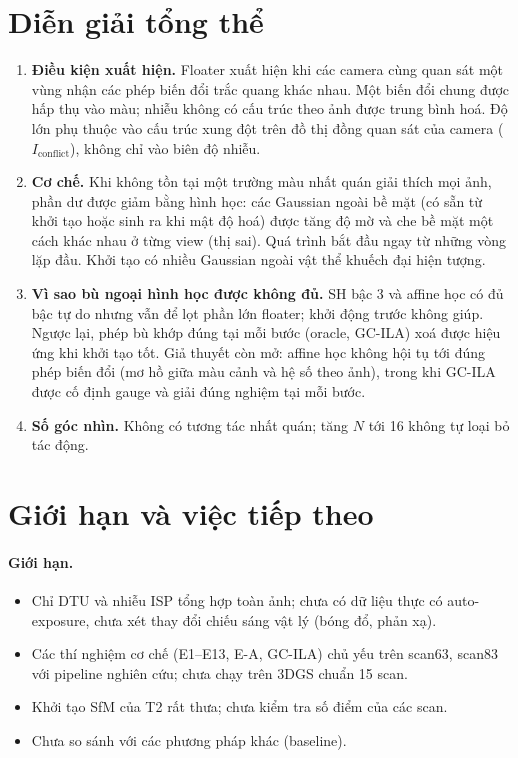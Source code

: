 \documentclass[11pt,a4paper]{article}
\begin{document}
\section{Diễn giải tổng thể}
\begin{enumerate}
  \item \textbf{Điều kiện xuất hiện.} Floater xuất hiện khi các camera cùng quan sát một vùng nhận các phép biến đổi trắc quang khác nhau. Một biến đổi chung được hấp thụ vào màu; nhiễu không có cấu trúc theo ảnh được trung bình hoá. Độ lớn phụ thuộc vào cấu trúc xung đột trên đồ thị đồng quan sát của camera ($I_{\text{conflict}}$), không chỉ vào biên độ nhiễu.
  \item \textbf{Cơ chế.} Khi không tồn tại một trường màu nhất quán giải thích mọi ảnh, phần dư được giảm bằng hình học: các Gaussian ngoài bề mặt (có sẵn từ khởi tạo hoặc sinh ra khi mật độ hoá) được tăng độ mờ và che bề mặt một cách khác nhau ở từng view (thị sai). Quá trình bắt đầu ngay từ những vòng lặp đầu. Khởi tạo có nhiều Gaussian ngoài vật thể khuếch đại hiện tượng.
  \item \textbf{Vì sao bù ngoại hình học được không đủ.} SH bậc 3 và affine học có đủ bậc tự do nhưng vẫn để lọt phần lớn floater; khởi động trước không giúp. Ngược lại, phép bù khớp đúng tại mỗi bước (oracle, GC-ILA) xoá được hiệu ứng khi khởi tạo tốt. Giả thuyết còn mở: affine học không hội tụ tới đúng phép biến đổi (mơ hồ giữa màu cảnh và hệ số theo ảnh), trong khi GC-ILA được cố định gauge và giải đúng nghiệm tại mỗi bước.
  \item \textbf{Số góc nhìn.} Không có tương tác nhất quán; tăng $N$ tới 16 không tự loại bỏ tác động.
\end{enumerate}

\section{Giới hạn và việc tiếp theo}
\paragraph{Giới hạn.}
\begin{itemize}
  \item Chỉ DTU và nhiễu ISP tổng hợp toàn ảnh; chưa có dữ liệu thực có auto-exposure, chưa xét thay đổi chiếu sáng vật lý (bóng đổ, phản xạ).
  \item Các thí nghiệm cơ chế (E1--E13, E-A, GC-ILA) chủ yếu trên scan63, scan83 với pipeline nghiên cứu; chưa chạy trên 3DGS chuẩn 15 scan.
  \item Khởi tạo SfM của T2 rất thưa; chưa kiểm tra số điểm của các scan.
  \item Chưa so sánh với các phương pháp khác (baseline).
\end{itemize}
\end{document}
